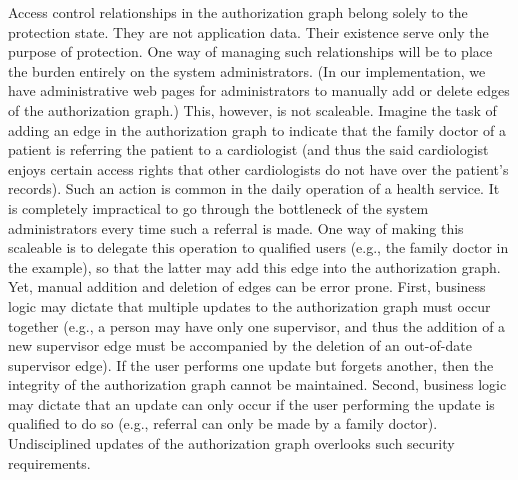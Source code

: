 \documentclass{acm_proc_article-sp}
\begin{document}
Access control relationships in the authorization graph belong solely
to the protection state.  They are not application data. Their
existence serve only the purpose of protection.  One way of managing
such relationships will be to place the burden entirely on the system
administrators.  (In our implementation, we have administrative web
pages for administrators to manually add or delete edges of the
authorization graph.)  This, however, is not scaleable.  Imagine the
task of adding an edge in the authorization graph to indicate that the
family doctor of a patient is referring the patient to a cardiologist
(and thus the said cardiologist enjoys certain access rights that
other cardiologists do not have over the patient's records).  Such an
action is common in the daily operation of a health service. It is
completely impractical to go through the bottleneck of the system
administrators every time such a referral is made.  One way of making
this scaleable is to delegate this operation to qualified users (e.g.,
the family doctor in the example), so that the latter may add this
edge into the authorization graph.  Yet, manual addition and deletion
of edges can be error prone.  First, business logic may dictate that
multiple updates to the authorization graph must occur together (e.g.,
a person may have only one supervisor, and thus the addition of a new
supervisor edge must be accompanied by the deletion of an out-of-date
supervisor edge). If the user performs one update but forgets another,
then the integrity of the authorization graph cannot be
maintained. Second, business logic may dictate that an update can only
occur if the user performing the update is qualified to do so (e.g.,
referral can only be made by a family doctor).  Undisciplined updates
of the authorization graph overlooks such security requirements.
\end{document}
